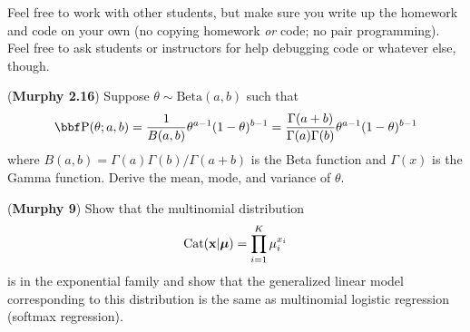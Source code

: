 \documentclass[12pt,letterpaper,fleqn]{hmcpset}
\begin{document}
Feel free to work with other students, but make sure you write up the homework
and code on your own (no copying homework \textit{or} code; no pair programming).
Feel free to ask students or instructors for help debugging code or whatever else,
though.

\begin{problem}[1]
(\textbf{Murphy 2.16}) Suppose $\theta \sim \text{Beta}(a,b)$ such
        that
        \[
            \PP(\theta; a,b) = \frac{1}{B(a,b)} \theta^{a-1}(1-\theta)^{b-1} = \frac{\Gamma(a+b)}{\Gamma(a)\Gamma(b)} \theta^{a-1}(1-\theta)^{b-1}
        \]
        where $B(a,b) = \Gamma(a)\Gamma(b)/\Gamma(a+b)$ is the Beta function
        and $\Gamma(x)$ is the Gamma function.
        Derive the mean, mode, and variance of $\theta$.
\end{problem}
\begin{solution}
\vfill
\end{solution}
\newpage

\begin{problem}[2]
(\textbf{Murphy 9}) Show that the multinomial distribution
\[
    \text{Cat}({\bf x}|\hbox{\boldmath$\mu$}) = \prod_{i=1}^K \mu_i^{x_i}
\]
is in the exponential family and show that the generalized linear model
corresponding to this distribution is the same as multinomial logistic
regression (softmax regression).
\end{problem}
\begin{solution}
\vfill
\end{solution}
\newpage
\end{document}
